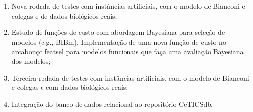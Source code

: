 \documentclass[12pt]{article}
\begin{document}
\begin{enumerate}
    \item Nova rodada de testes com instâncias artificiais, com o modelo de Bianconi e colegas e de dados biológicos reais;
   
    \item Estudo de funções de custo com abordagem Bayesiana para seleção de modelos (e.g., BIBm). Implementação de uma nova função de custo no arcabouço featsel para modelos funcionais que faça uma avaliação Bayesiana dos modelos;

    \item Terceira rodada de testes com instâncias artificiais, com o modelo de Bianconi e colegas e com dados biológicos reais;

    \item Integração do banco de dados relacional ao repositório CeTICSdb.

\end{enumerate}
\end{document}
